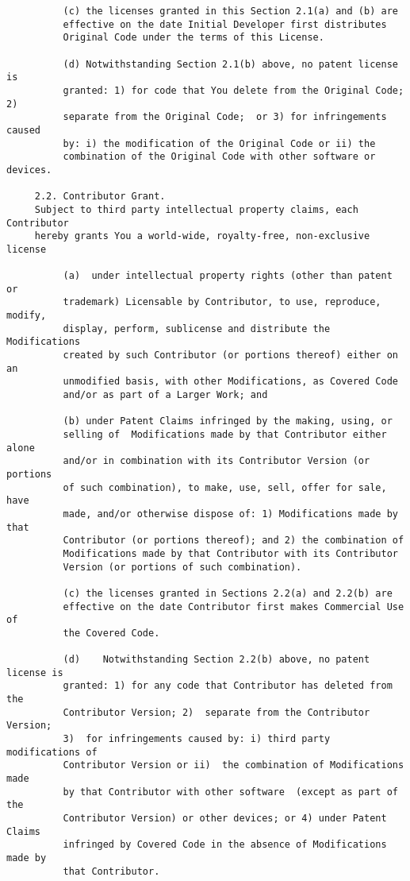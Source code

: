 \begin{verbatim}
          (c) the licenses granted in this Section 2.1(a) and (b) are
          effective on the date Initial Developer first distributes
          Original Code under the terms of this License.

          (d) Notwithstanding Section 2.1(b) above, no patent license is
          granted: 1) for code that You delete from the Original Code; 2)
          separate from the Original Code;  or 3) for infringements caused
          by: i) the modification of the Original Code or ii) the
          combination of the Original Code with other software or devices.

     2.2. Contributor Grant.
     Subject to third party intellectual property claims, each Contributor
     hereby grants You a world-wide, royalty-free, non-exclusive license

          (a)  under intellectual property rights (other than patent or
          trademark) Licensable by Contributor, to use, reproduce, modify,
          display, perform, sublicense and distribute the Modifications
          created by such Contributor (or portions thereof) either on an
          unmodified basis, with other Modifications, as Covered Code
          and/or as part of a Larger Work; and

          (b) under Patent Claims infringed by the making, using, or
          selling of  Modifications made by that Contributor either alone
          and/or in combination with its Contributor Version (or portions
          of such combination), to make, use, sell, offer for sale, have
          made, and/or otherwise dispose of: 1) Modifications made by that
          Contributor (or portions thereof); and 2) the combination of
          Modifications made by that Contributor with its Contributor
          Version (or portions of such combination).

          (c) the licenses granted in Sections 2.2(a) and 2.2(b) are
          effective on the date Contributor first makes Commercial Use of
          the Covered Code.

          (d)    Notwithstanding Section 2.2(b) above, no patent license is
          granted: 1) for any code that Contributor has deleted from the
          Contributor Version; 2)  separate from the Contributor Version;
          3)  for infringements caused by: i) third party modifications of
          Contributor Version or ii)  the combination of Modifications made
          by that Contributor with other software  (except as part of the
          Contributor Version) or other devices; or 4) under Patent Claims
          infringed by Covered Code in the absence of Modifications made by
          that Contributor.


\end{verbatim}
